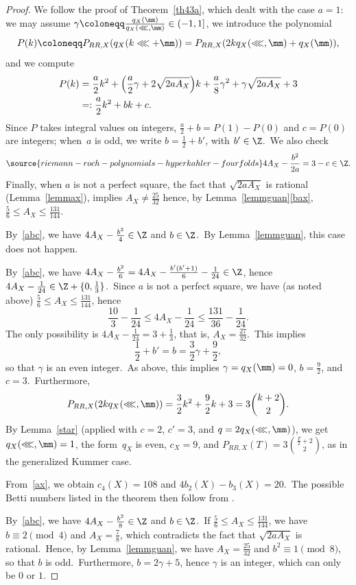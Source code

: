 \begin{proof}
We follow the proof of Theorem~\ref{th43a}, which dealt with the case $a=1$:  we may assume  $\gamma\coloneqq \frac{q_X(\mm)}{q_X(\lll,\mm)}\in (-1,1] $, we introduce the polynomial
$$P(k)\coloneqq P_{RR,X}(q_X(k\lll+ \mm))=P_{RR,X}(2kq_X(\lll,\mm)+q_X(\mm)),$$
and we compute
\begin{align*}
 P(k)&=\frac{a}{2}k^2+\Bigl( \frac{a}{2}\gamma+2\sqrt{2aA_X} \Bigr)k+\frac{a}{8}\gamma^2+ \gamma\sqrt{2aA_X}+3\\
 &=:\frac{a}{2}k^2 +  b  k +c.
\end{align*}
Since $P$ takes integral values on integers, $\frac{a}2+b=P(1)-P(0)$ and $c=P(0)$ are integers; when~$a$ is odd, we write $b=\frac12+b'$, with $b'\in\Z$.\ We also check
 \begin{equation}\label{abc}
\source{riemann-roch-polynomials-hyperkahler-fourfolds}
    4A_X-\frac{b^2}{2a} =3-c \in\Z.
\end{equation}
 Finally, when $a$ is not a perfect square, the fact that $\sqrt{2aA_X}$ is rational (Lemma~\ref{lemmax}), implies $A_X\ne\frac{25}{32}$ hence, by Lemma~\ref{lemmguan}\ref{bax},    $\frac56\le A_X\le\frac{131}{144}$.



 By~\eqref{abc}, we  have $4A_X-\frac{b^2}4\in\Z$ and $b\in\Z$.\ By Lemma~\ref{lemmguan}, this case does not happen.


 By~\eqref{abc}, we  have $4A_X- \frac{b^2}6=4A_X-\frac{b'(b'+1)}6-\frac1{24}\in\Z$, hence $4A_X -\frac1{24}\in \Z+\{0,\frac13\}$.\
Since $a$ is not a perfect square, we have (as noted above) $\frac{5}{6}\le A_X\le\frac{131}{144} $, hence
\[
\frac{10}{3} -\frac1{24} \le 4A_X -\frac1{24}\le\frac{131}{36} -\frac1{24}.
\]
The only possibility is  $4A_X-\frac1{24}=3+\frac{1}3$, that is, $A_X=\frac{27}{32}$.\
This implies
$$\frac12+b'=b=\frac{3}{2}\gamma+\frac92,$$
so that $\gamma$ is an even integer.\ As above, this implies $\gamma=q_X(\mm)=0$, $b=\frac92$, and $c = 3$.\ Furthermore,
\[
P_{RR,X}(2kq_X(\lll,\mm))=  \frac{3}{2}k^2 +  \frac92  k +3=3\binom{k+2}{2}.
\]
By Lemma~\ref{star} (applied with $c=2$, $c'=3$, and $q=2q_X(\lll,\mm)$),
we get $q_X(\lll,\mm)=1$, the form~$q_X$ is even, $c_X=9$, and $P_{RR,X}(T)=   3\binom{\frac{T}2+2}{2}$, as in the generalized Kummer case.


From~\eqref{ax}, we obtain $c_4(X)=108$ and $4b_2(X)-b_3(X)=20 $.\
The possible Betti numbers listed in the theorem then follow from \cite{gua}.


 By~\eqref{abc}, we   have $4A_X-\frac{b^2}8\in\Z$ and $b\in\Z$.\
If $\frac{5}{6}\le A_X\le\frac{131}{144} $, we have $b\equiv 2\pmod4$ and $A_X=\frac78$, which contradicts the fact that $\sqrt{2aA_X}$ is   rational.\
Hence, by Lemma~\ref{lemmguan}, we have $A_X=\frac{25}{32}$ and $b^2\equiv 1\pmod8$, so that $b$ is odd.\ Furthermore, $b=2\gamma +5$, hence $\gamma$ is an integer, which can only be $0$ or $1$.


\end{proof}
